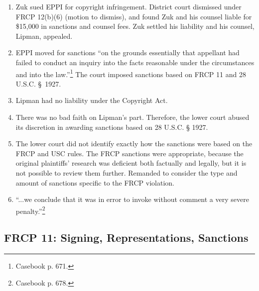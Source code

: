 \begin{enumerate}
    \item Zuk sued EPPI for copyright infringement. District court dismissed 
    under FRCP 12(b)(6) (motion to dismiss), and found Zuk and his counsel 
    liable for \$15,000 in sanctions and counsel fees. Zuk settled his 
    liability and his counsel, Lipman, appealed.
    \item EPPI moved for sanctions ``on the grounds essentially that appellant 
    had failed to conduct an inquiry into the facts reasonable under the 
    circumstances and into the law.''\footnote{Casebook p. 671.} The court 
    imposed sanctions based on FRCP 11 and 28 U.S.C. § 1927.
    \item Lipman had no liability under the Copyright Act.
    \item There was no bad faith on Lipman's part. Therefore, the lower court 
    abused its discretion in awarding sanctions based on 28 U.S.C. § 1927.
    \item The lower court did not identify exactly how the sanctions were 
    based on the FRCP and USC rules. The FRCP sanctions were appropriate, 
    because the original plaintiffs' research was deficient both factually and 
    legally, but it is not possible to review them further. Remanded to 
    consider the type and amount of sanctions specific to the FRCP violation.
    \item ``...we conclude that it was in error to invoke without comment a 
    very severe penalty.''\footnote{Casebook p. 678.}
\end{enumerate}

\subsection{FRCP 11: Signing, Representations, Sanctions}

